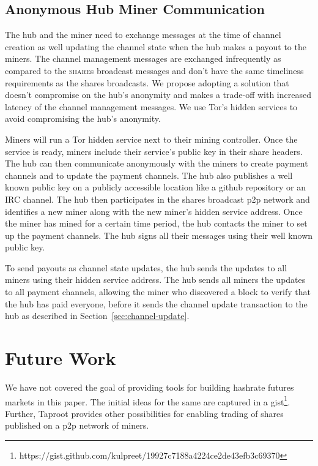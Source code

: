 \documentclass{article}
\begin{document}
\subsection{Anonymous Hub Miner
  Communication}\label{sec:hub-miner-communication}

The hub and the miner need to exchange messages at the time of channel
creation as well updating the channel state when the hub makes a
payout to the miners. The channel management messages are exchanged
infrequently as compared to the \textsc{share}s broadcast messages and
don't have the same timeliness requirements as the shares
broadcasts. We propose adopting a solution that doesn't compromise on
the hub's anonymity and makes a trade-off with increased latency of
the channel management messages. We use Tor's hidden services to avoid
compromising the hub's anonymity.

Miners will run a Tor hidden service next to their mining
controller. Once the service is ready, miners include their service's
public key in their share headers. The hub can then communicate
anonymously with the miners to create payment channels and to update
the payment channels. The hub also publishes a well known public key
on a publicly accessible location like a github repository or an IRC
channel. The hub then participates in the shares broadcast p2p network
and identifies a new miner along with the new miner's hidden service
address. Once the miner has mined for a certain time period, the hub
contacts the miner to set up the payment channels. The hub signs all
their messages using their well known public key.

To send payouts as channel state updates, the hub sends the updates to
all miners using their hidden service address. The hub sends all
miners the updates to all payment channels, allowing the miner who
discovered a block to verify that the hub has paid everyone, before it
sends the channel update transaction to the hub as described in
Section~\ref{sec:channel-update}.

\section{Future Work}

We have not covered the goal of providing tools for building hashrate
futures markets in this paper. The initial ideas for the same are
captured in a
gist\footnote{https://gist.github.com/kulpreet/19927c7188a4224ce2de43efb3c69370}. Further,
Taproot provides other possibilities for enabling trading of shares
published on a p2p network of miners.
\end{document}
